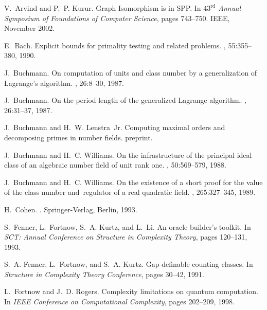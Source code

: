 \documentclass{article}
\theoremstyle{definition}\newtheorem{remark}[theorem]{Remark}
\begin{document}
\begin{thebibliography}{10}

V.~Arvind and P.~P. Kurur.
\newblock Graph {Isomorphism} is in {SPP}.
\newblock In {\em $43^{\mathrm{rd}}$ Annual Symposium of Foundations of
  Computer Science}, pages 743--750. IEEE, November 2002.

E.~Bach.
\newblock Explicit bounds for primality testing and related problems.
, 55:355--380, 1990.

J.~Buchmann.
\newblock On computation of units and class number by a generalization of
  {Lagrange's} algorithm.
, 26:8--30, 1987.

J.~Buchmann.
\newblock On the period length of the generalized {Lagrange} algorithm.
, 26:31--37, 1987.

J.~Buchmann and H.~W. {Lenstra~Jr}.
\newblock Computing maximal orders and decomposing primes in number fields.
\newblock preprint.

J.~Buchmann and H.~C. Williams.
\newblock On the infrastructure of the principal ideal class of an algebraic
  number field of unit rank one.
, 50:569--579, 1988.

J.~Buchmann and H.~C. Williams.
\newblock On the existence of a short proof for the value of the class number
  and\ regulator of a real quadratic field.
, 265:327--345, 1989.

H.~Cohen.
.
\newblock Springer-Verlag, Berlin, 1993.

S.~Fenner, L.~Fortnow, S.~A. Kurtz, and L.~Li.
\newblock An oracle builder's toolkit.
\newblock In {\em {SCT}: Annual Conference on Structure in Complexity Theory},
  pages 120--131, 1993.

S.~A. Fenner, L.~Fortnow, and S.~A. Kurtz.
\newblock Gap-definable counting classes.
\newblock In {\em Structure in Complexity Theory Conference}, pages 30--42,
  1991.

L.~Fortnow and J.~D. Rogers.
\newblock Complexity limitations on quantum computation.
\newblock In {\em {IEEE} Conference on Computational Complexity}, pages
  202--209, 1998.


\end{thebibliography}
\end{document}
